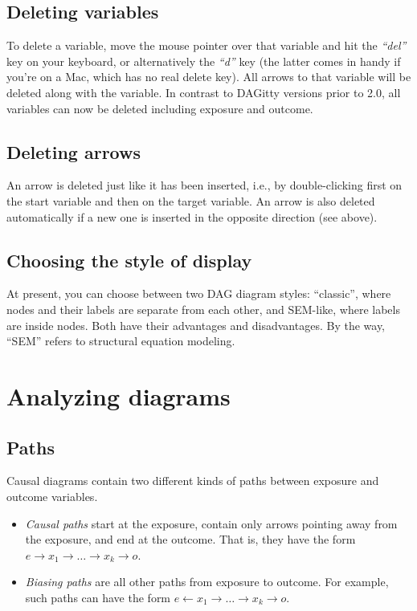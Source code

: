 \documentclass[a4paper,10pt]{article}
\newcommand{\pname}{{\sc DAG}itty\xspace}
\newcommand{\action}[1]{\emph{``#1''}}
\begin{document}
\subsection{Deleting variables}

To delete a variable, move the mouse pointer over that variable 
and hit the \action{del} key on your keyboard, or alternatively
the \action{d} key (the latter comes in handy if you're on a Mac, which 
has no real delete key).
All arrows to that variable will be deleted along 
with the variable. In contrast to \pname versions prior to 2.0,
all variables can now be deleted including exposure and outcome.

\subsection{Deleting arrows}

An arrow is deleted just like it has been inserted, 
i.e., by double-clicking first on the start 
variable and then on the target variable. An arrow 
is also deleted automatically if a new one is 
inserted in the opposite direction (see above). 

\subsection{Choosing the style of display}

At present, you can choose between two DAG diagram styles: ``classic'', where nodes and
their labels are separate from each other, and SEM-like, where labels are inside nodes. 
Both have their advantages and disadvantages. By the way, ``SEM'' refers to structural
equation modeling.

\section{Analyzing diagrams}

\label{sec:diagramanalysis}

\subsection{Paths}

Causal diagrams contain two different kinds of paths between exposure and outcome
variables.

\begin{itemize}
\item \emph{Causal paths} start at the exposure, contain
only arrows pointing away from the exposure, and end at 
the outcome. That is, they have the form
$e \rightarrow x_1 \rightarrow \ldots \rightarrow x_k \rightarrow o$.
\item \emph{Biasing paths} are all other paths from exposure to outcome. For 
example, such paths can have the form 
$e \leftarrow x_1 \rightarrow \ldots \rightarrow x_k \rightarrow o$.
\end{itemize}
\end{document}
